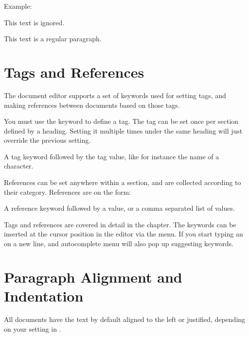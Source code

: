 \documentclass[a4paper,11pt,english]{sphinxmanual}
\begin{document}
\sphinxAtStartPar
Example:

\begin{sphinxVerbatim}[commandchars=\\\{\}]
\PYGZpc{}\PYGZti{} This text is ignored.

This text is a regular paragraph.
\end{sphinxVerbatim}


\section{Tags and References}
\label{\detokenize{usage_format:tags-and-references}}\label{\detokenize{usage_format:a-fmt-tags}}
\sphinxAtStartPar
The document editor supports a set of keywords used for setting tags, and making references between
documents based on those tags.

\sphinxAtStartPar
You must use the keyword  to define a tag. The tag can be set once per section defined by
a heading. Setting it multiple times under the same heading will just override the previous
setting.
\begin{description}
\sphinxAtStartPar
A tag keyword followed by the tag value, like for instance the name of a character.

\end{description}

\sphinxAtStartPar
References can be set anywhere within a section, and are collected according to their category.
References are on the form:
\begin{description}
\sphinxAtStartPar
A reference keyword followed by a value, or a comma separated list of values.

\end{description}

\sphinxAtStartPar
Tags and references are covered in detail in the {\hyperref[\detokenize{project_references:a-references}]{}} chapter. The keywords can be
inserted at the cursor position in the editor via the  menu. If you start typing an 
on a new line, and auto\sphinxhyphen{}complete menu will also pop up suggesting keywords.


\section{Paragraph Alignment and Indentation}
\label{\detokenize{usage_format:paragraph-alignment-and-indentation}}\label{\detokenize{usage_format:a-fmt-align}}
\sphinxAtStartPar
All documents have the text by default aligned to the left or justified, depending on your setting
in .
\end{document}
